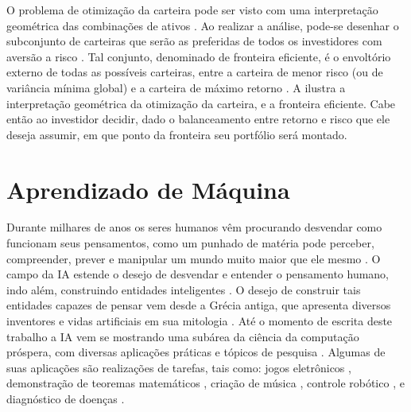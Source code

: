 
O problema de otimização da carteira pode ser visto com uma interpretação geométrica das combinações de ativos \cite{elton2012moderna}. Ao realizar a análise, pode-se desenhar o subconjunto de carteiras que serão as preferidas de todos os investidores com aversão a risco \cite{elton2012moderna}. Tal conjunto, denominado de fronteira eficiente, é o envoltório externo de todas as possíveis carteiras, entre a carteira de menor risco (ou de variância mínima global) e a carteira de máximo retorno \cite{elton2012moderna}. A  ilustra a interpretação geométrica da otimização da carteira, e a fronteira eficiente. Cabe então ao investidor decidir, dado o balanceamento entre retorno e risco que ele deseja assumir, em que ponto da fronteira seu portfólio será montado. 


\section{Aprendizado de Máquina} 

Durante milhares de anos os seres humanos vêm procurando desvendar como funcionam seus pensamentos, como um punhado de matéria pode perceber, compreender, prever e manipular um mundo muito maior que ele mesmo \cite{modern_approach}. O campo da \acrfull{IA} estende o desejo de desvendar e entender o pensamento humano, indo além, construindo entidades inteligentes \cite{modern_approach}. O desejo de construir tais entidades capazes de pensar vem desde a Grécia antiga, que apresenta diversos inventores e vidas artificiais em sua mitologia \cite{deep_learning}. Até o momento de escrita deste trabalho a \acrshort{IA} vem se mostrando uma subárea da ciência da computação próspera, com diversas aplicações práticas e tópicos de pesquisa \cite{deep_learning, ga_optimized_lstm, random_forest_macroeconomic, airms, clustering_svm, hybrid_forecasting, starcraft, nn_forecasting}. Algumas de suas aplicações são realizações de tarefas, tais como: jogos eletrônicos \cite{starcraft}, demonstração de teoremas matemáticos \cite{bibel2013automated}, criação de música \cite{dhariwal2020jukebox}, controle robótico \cite{gu2017deep}, e diagnóstico de doenças \cite{coronga}.

